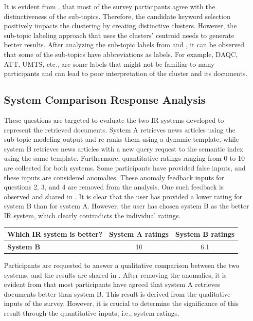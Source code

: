 It is evident from , that most of the survey participants agree with the distinctiveness of the sub-topics. Therefore, the candidate keyword selection positively impacts the clustering by creating distinctive clusters. However, the sub-topic labeling approach that uses the clusters' centroid needs to generate better results. After analyzing the sub-topic labels from  and , it can be observed that some of the sub-topics have abbreviations as labels. For example, DAQC, ATT, UMTS, etc., are some labels that might not be familiar to many participants and can lead to poor interpretation of the cluster and its documents.

\subsection{System Comparison Response Analysis}

These questions are targeted to evaluate the two IR systems developed to represent the retrieved documents. System A retrieves news articles using the sub-topic modeling output and re-ranks them using a dynamic template, while system B retrieves news articles with a new query request to the semantic index using the same template. Furthermore, quantitative ratings ranging from 0 to 10 are collected for both systems. Some participants have provided false inputs, and these inputs are considered anomalies. These anomaly feedback inputs for questions 2, 3, and 4 are removed from the analysis. One such feedback is observed and shared in . It is clear that the user has provided a lower rating for system B than for system A. However, the user has chosen system B as the better \ac{IR} system, which clearly contradicts the individual ratings.


 \begin{center}
	\label{tab:question_234_anamoly}
	\begin{tabularx}{.8\textwidth}{|Y|c|c|}
		\hline
		Which IR system is better? & System A ratings & System B ratings \\
		\hline
		\textbf{System B} & 10 & 6.1 \\
		\hline
	\end{tabularx}
\end{center} 

Participants are requested to answer a qualitative comparison between the two systems, and the results are shared in . After removing the anomalies, it is evident from  that most participants have agreed that system A retrieves documents better than system B. This result is derived from the qualitative inputs of the survey. However, it is crucial to determine the significance of this result through the quantitative inputs, i.e., system ratings.\\

